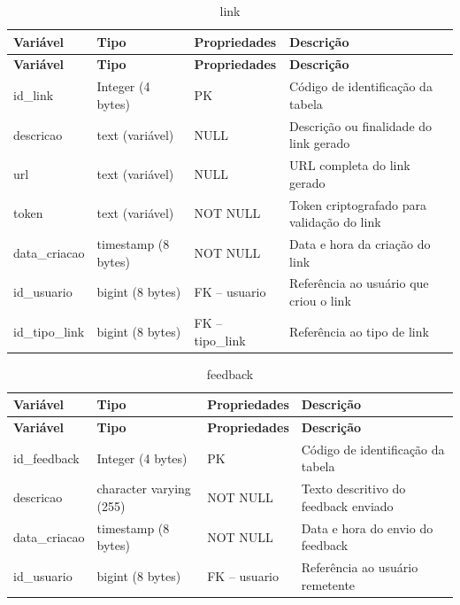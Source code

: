 \fonteautores

\vspace{\baselineskip}

\Needspace{0.32\textheight}
\begin{longtable}{|L{5.2cm}|L{3.2cm}|L{2.4cm}|L{3.4cm}|}
\caption{link} \\
\hline
\textbf{Variável} & \textbf{Tipo} & \textbf{Propriedades} & \textbf{Descrição} \\
\hline
\endfirsthead
\hline
\textbf{Variável} & \textbf{Tipo} & \textbf{Propriedades} & \textbf{Descrição} \\
\hline
\endhead
id\_link & Integer (4 bytes) & PK & Código de identificação da tabela \\
\hline
descricao & text (variável) & NULL & Descrição ou finalidade do link gerado \\
\hline
url & text (variável) & NULL & URL completa do link gerado \\
\hline
token & text (variável) & NOT NULL & Token criptografado para validação do link \\
\hline
data\_criacao & timestamp (8 bytes) & NOT NULL & Data e hora da criação do link \\
\hline
id\_usuario & bigint (8 bytes) & FK – usuario & Referência ao usuário que criou o link \\
\hline
id\_tipo\_link & bigint (8 bytes) & FK – tipo\_link & Referência ao tipo de link \\
\hline
\end{longtable}

\fonteautores

\vspace{\baselineskip}

\Needspace{0.32\textheight}
\begin{longtable}{|L{5.2cm}|L{3.2cm}|L{2.4cm}|L{3.4cm}|}
\caption{feedback} \\
\hline
\textbf{Variável} & \textbf{Tipo} & \textbf{Propriedades} & \textbf{Descrição} \\
\hline
\endfirsthead
\hline
\textbf{Variável} & \textbf{Tipo} & \textbf{Propriedades} & \textbf{Descrição} \\
\hline
\endhead
id\_feedback & Integer (4 bytes) & PK & Código de identificação da tabela \\
\hline
descricao & character varying (255) & NOT NULL & Texto descritivo do feedback enviado \\
\hline
data\_criacao & timestamp (8 bytes) & NOT NULL & Data e hora do envio do feedback \\
\hline
id\_usuario & bigint (8 bytes) & FK – usuario & Referência ao usuário remetente \\
\hline
\end{longtable}

